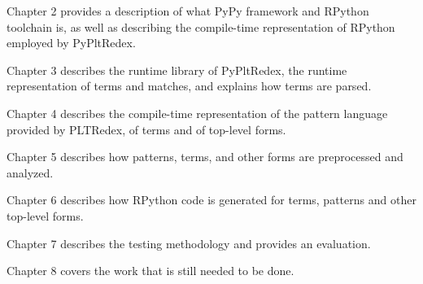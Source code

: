 Chapter 2 provides a description of what PyPy framework and RPython toolchain is, as well as describing the compile-time representation of RPython employed by PyPltRedex.

Chapter 3 describes the runtime library of PyPltRedex, the runtime representation of terms and matches, and explains how terms are parsed.

Chapter 4 describes the compile-time representation of the pattern language provided by PLTRedex, of terms and of top-level forms.

Chapter 5 describes how patterns, terms, and other forms are preprocessed and analyzed.

Chapter 6 describes how RPython code is generated for terms, patterns and other top-level forms.

Chapter 7 describes the testing methodology and provides an evaluation. 

Chapter 8 covers the work that is still needed to be done.



